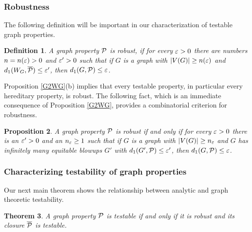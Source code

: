 \documentclass{article}
\newtheorem{theorem}{Theorem}[section]
\newtheorem{prop}[theorem]{Proposition}
\newtheorem{definition}[theorem]{Definition}
\begin{document}
\subsubsection{Robustness}

The following definition will be important in our characterization of
testable graph properties.

\begin{definition}
A graph property $\mathcal{P}$ is {\it robust}, if for every $\varepsilon>0$ there
are numbers $n=n(\varepsilon)>0$ and $\varepsilon'>0$ such that if $G$ is a graph
with $|V(G)|\geq n(\varepsilon)$ and $d_1(W_G,\overline{\mathcal{P}})\leq \varepsilon'$,
then $d_1(G,\mathcal{P})\leq\varepsilon$.
\end{definition}

Proposition \ref{G2WG}(b) implies that every testable property, in
particular every hereditary property, is robust. The following fact,
which is an immediate consequence of Proposition \ref{G2WG}, provides
a combinatorial criterion for robustness.

\begin{prop}\label{BLOWUP-ROB}
A graph property $\mathcal{P}$ is robust if and only if for every $\varepsilon>0$
there is an $\varepsilon'>0$ and an $n_\varepsilon\ge 1$ such that if $G$ is a
graph with $|V(G)|\ge n_\varepsilon$ and $G$ has infinitely many equitable
blowups $G'$ with $d_1(G',\mathcal{P})\le\varepsilon'$, then $d_1(G,\mathcal{P})\le\varepsilon$.
\end{prop}

\subsubsection{Characterizing testability of graph properties}

Our next main theorem shows the relationship between analytic and
graph theoretic testability.

\begin{theorem}\label{char1}
A graph property $\mathcal{P}$ is testable if and only if it is robust and
its closure $\overline{\mathcal{P}}$ is testable.
\end{theorem}
\end{document}
